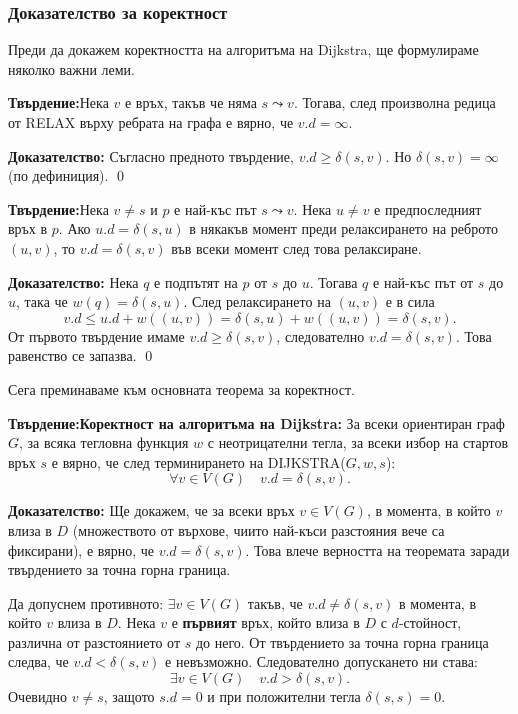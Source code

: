 \documentclass{article}
\renewcommand{\\}{\newline}
\newcommand{\tv}{\textbf{Твърдение:\;}}
\newcommand{\doc}{\textbf{Доказателство: }}
\begin{document}
\subsubsection{Доказателство за коректност}

Преди да докажем коректността на алгоритъма на Dijkstra, ще формулираме няколко важни леми.

\tv Нека \(v\) е връх, такъв че няма \(s \leadsto v\). Тогава, след произволна редица от RELAX върху ребрата на графа е вярно, че \(v.d = \infty\).

\doc Съгласно предното твърдение, \(v.d \ge \delta(s, v)\). Но \(\delta(s, v) = \infty\) (по дефиниция). \qed

\tv Нека \(v \ne s\) и \(p\) е най-къс път \(s \leadsto v\). Нека \(u \ne v\) е предпоследният връх в \(p\). Ако \(u.d = \delta(s, u)\) в някакъв момент преди релаксирането на реброто \((u, v)\), то \(v.d = \delta(s, v)\) във всеки момент след това релаксиране.

\doc Нека \(q\) е подпътят на \(p\) от \(s\) до \(u\). Тогава \(q\) е най-къс път от \(s\) до \(u\), така че \(w(q) = \delta(s, u)\). След релаксирането на \((u, v)\) е в сила
\[
v.d \le u.d + w((u, v)) = \delta(s, u) + w((u, v)) = \delta(s, v).
\]
От първото твърдение имаме \(v.d \ge \delta(s, v)\), следователно \(v.d = \delta(s, v)\). Това равенство се запазва. \qed

Сега преминаваме към основната теорема за коректност.

\tv \textbf{Коректност на алгоритъма на Dijkstra:}
За всеки ориентиран граф \(G\), за всяка тегловна функция \(w\) с неотрицателни тегла, за всеки избор на стартов връх \(s\) е вярно, че след терминирането на DIJKSTRA(\(G, w, s\)):
\[
\forall v \in V(G) \quad v.d = \delta(s, v).
\]

\doc
    Ще докажем, че за всеки връх \(v \in V(G)\), в момента, в който \(v\) влиза в \(D\) (множеството от върхове, чиито най-къси разстояния вече са фиксирани), е вярно, че \(v.d = \delta(s, v)\). Това влече верността на теоремата заради твърдението за точна горна граница.

    Да допуснем противното: \(\exists v \in V(G)\) такъв, че \(v.d \neq \delta(s, v)\) в момента, в който \(v\) влиза в \(D\). Нека \(v\) е \textbf{първият} връх, който влиза в \(D\) с \(d\)-стойност, различна от разстоянието от \(s\) до него. От твърдението за точна горна граница следва, че \(v.d < \delta(s, v)\) е невъзможно. Следователно допускането ни става:
    \[
    \exists v \in V(G) \quad v.d > \delta(s, v).
    \]
    Очевидно \(v \neq s\), защото \(s.d = 0\) и при положителни тегла \(\delta(s, s) = 0\).
\end{document}

